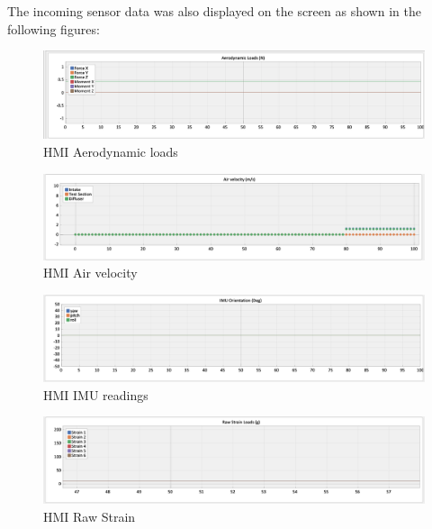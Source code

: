 The incoming sensor data was also displayed on the screen as shown in the following figures:
\begin{center}
	\begin{figure}[H]
		\centering
		\includegraphics[width=1\linewidth]{Figures/Screenshot 2022-12-11 194656.png}
		\caption[HMI Aerodynamic loads]{HMI Aerodynamic loads}
	\end{figure}
\end{center}
\begin{center}
	\begin{figure}[H]
		\centering
		\includegraphics[width=1\linewidth]{Figures/Screenshot 2022-12-11 194826.png}
		\caption[HMI Air velocity]{HMI Air velocity}
	\end{figure}
\end{center}
\begin{center}
	\begin{figure}[H]
		\centering
		\includegraphics[width=1\linewidth]{Figures/Screenshot 2022-12-11 194952.png}
		\caption[HMI IMU readings]{HMI IMU readings}
	\end{figure}
\end{center}
\begin{center}
	\begin{figure}[H]
		\centering
		\includegraphics[width=1\linewidth]{Figures/Screenshot 2022-12-11 194931.png}
		\caption[HMI Raw Strain]{HMI Raw Strain}
	\end{figure}
\end{center}

